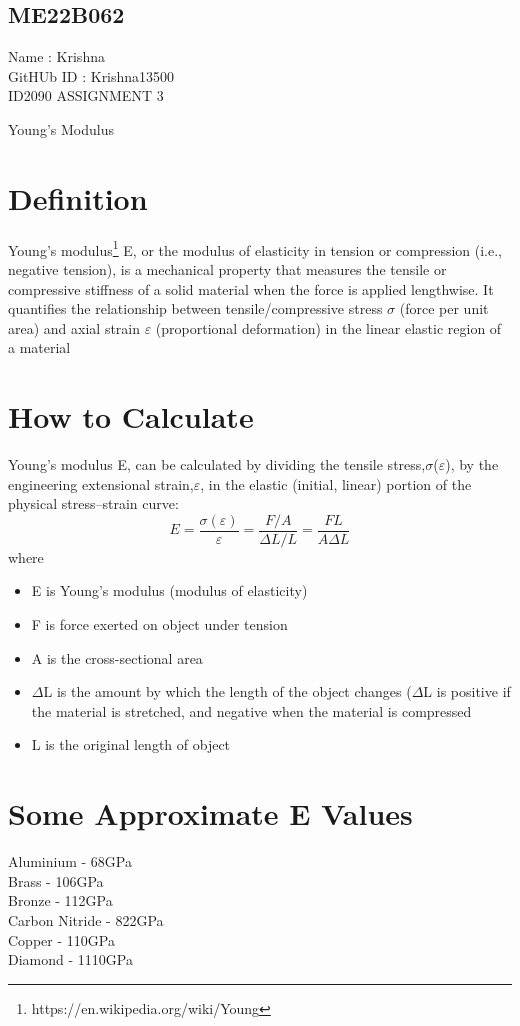 

\begin{center}

\section*{ME22B062}
Name : Krishna
\\
GitHUb ID : Krishna13500
\\
\Large{ID2090 ASSIGNMENT 3}

\Large{Young's Modulus}
\end{center}

\section{Definition}
Young's modulus\footnote{https://en.wikipedia.org/wiki/Young} E, or the modulus of elasticity in tension or compression (i.e., negative tension), is a mechanical property that measures the tensile or compressive stiffness of a solid material when the force is applied lengthwise. It quantifies the relationship between tensile/compressive stress 
$\sigma$ (force per unit area) and axial strain 
$\varepsilon$  (proportional deformation) in the linear elastic region of a material
\section{How to Calculate}
Young's modulus E, can be calculated by dividing the tensile stress,$\sigma$($\varepsilon$), by the engineering extensional strain,$\varepsilon$, in the elastic (initial, linear) portion of the physical stress–strain curve:
\begin{equation}
E = \frac{\sigma(\varepsilon)}{\varepsilon} = \frac{F/A}{\Delta L/L} = \frac{FL}{A\Delta L}
\end{equation}
where
\begin{itemize}
    \item E is Young's modulus (modulus of elasticity)
    \item F is force exerted on object under tension
    \item A is the cross-sectional area
    \item $\Delta$L is the amount by which the length of the object changes ($\Delta$L is positive if the material is stretched, and negative when the material is compressed
    \item L is the original length of object

\end{itemize}
\section{Some Approximate E Values}
Aluminium - 68GPa \\
Brass - 106GPa \\
Bronze - 112GPa \\ 
Carbon Nitride - 822GPa \\
Copper - 110GPa \\
Diamond - 1110GPa
